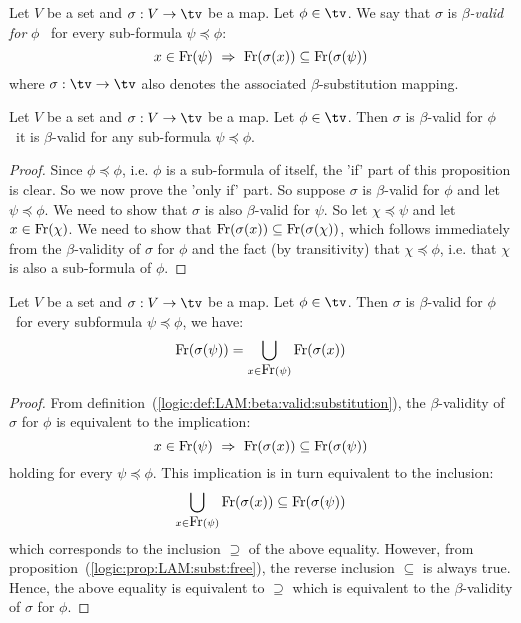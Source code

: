 \begin{defin}\label{logic:def:LAM:beta:valid:substitution}
Let $V$ be a set and $\sigma:V\to\tv$ be a map. Let
$\phi\in\tv$. We say that $\sigma$ is {\em $\beta$-valid for} $\phi$ \ifand\
for every sub-formula $\psi\preceq\phi$:
    \[
        x\in\free(\psi)\ \Rightarrow\ \free(\sigma(x))\subseteq\free(\sigma(\psi))
    \]
where $\sigma:\tv\to\tv$ also denotes the associated
$\beta$-substitution mapping.
\end{defin}

\begin{prop}\label{logic:prop:LAM:beta:valid:subformula}
Let $V$ be a set and $\sigma:V\to\tv$ be a map. Let
$\phi\in\tv$. Then $\sigma$ is $\beta$-valid for $\phi$ \ifand\ it is $\beta$-valid
for any sub-formula $\psi\preceq\phi$.
\end{prop}
\begin{proof}
Since $\phi\preceq\phi$, i.e. $\phi$ is a sub-formula of itself, the
'if' part of this proposition is clear. So we now prove the 'only
if' part. So suppose $\sigma$ is $\beta$-valid for $\phi$ and let
$\psi\preceq\phi$. We need to show that $\sigma$ is also $\beta$-valid for
$\psi$. So let $\chi\preceq\psi$ and let $x\in\mbox{\rm Fr}(\chi)$. We need
    to show that $\mbox{\rm Fr}(\sigma(x))\subseteq\mbox{\rm Fr}(\sigma(\chi))$, which follows
immediately from the $\beta$-validity of $\sigma$ for $\phi$ and the fact
(by transitivity) that $\chi\preceq\phi$, i.e. that $\chi$ is also a
sub-formula of $\phi$.
\end{proof}

\begin{prop}\label{logic:prop:beta:valid:free:commute}
    Let $V$ be a set and $\sigma:V\to\tv$ be a map. Let $\phi\in\tv$. 
    Then $\sigma$ is $\beta$-valid for $\phi$ \ifand\ for every 
    subformula $\psi\preceq\phi$, we have:
    \[
        \mbox{\rm Fr}(\sigma(\psi))
        =
        \bigcup_{x\in\mbox{\rm Fr}(\psi)} \mbox{\rm Fr}(\sigma(x))
    \]
\end{prop}
\begin{proof}
    From definition~(\ref{logic:def:LAM:beta:valid:substitution}), the 
    $\beta$-validity of $\sigma$ for $\phi$ is equivalent to the implication:
    \[
        x\in\free(\psi)\ \Rightarrow\ 
            \free(\sigma(x))
            \subseteq
            \free(\sigma(\psi))
    \]
    holding for every $\psi\preceq\phi$. This implication is in turn 
    equivalent to the inclusion:
    \[
        \bigcup_{x\in\mbox{\rm Fr}(\psi)} \mbox{\rm Fr}(\sigma(x))
        \subseteq
        \mbox{\rm Fr}(\sigma(\psi))
    \]
    which corresponds to the inclusion $\supseteq$ of the above equality.
    However, from proposition~(\ref{logic:prop:LAM:subst:free}), the reverse
    inclusion $\subseteq$ is always true. Hence, the above equality is
    equivalent to $\supseteq$ which is equivalent to the $\beta$-validity 
    of $\sigma$ for $\phi$.
\end{proof}
